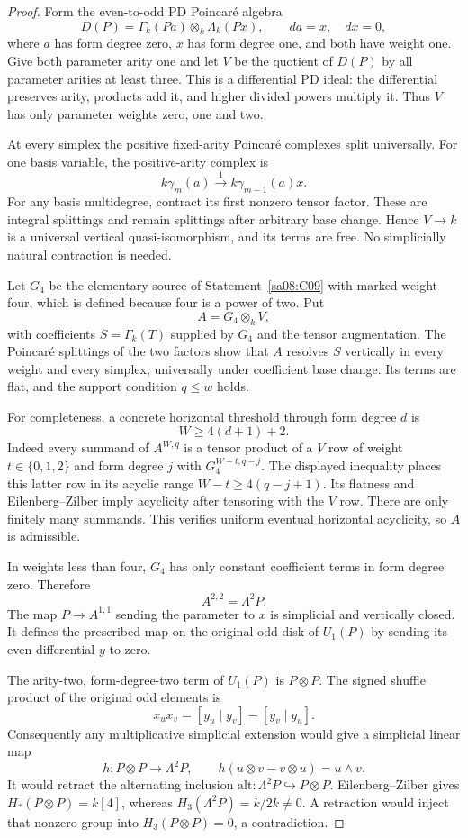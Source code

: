 \begin{proof}
Form the even-to-odd PD Poincar\'e algebra
\[
 D(P)=\Gamma_k(Pa)\otimes_k\Lambda_k(Px),\qquad
 da=x,\quad dx=0,
\]
where $a$ has form degree zero, $x$ has form degree one,
and both have weight one. Give both parameter arity one and let
$V$ be the quotient of $D(P)$ by all parameter arities at least three.
This is a differential PD ideal: the differential preserves arity,
products add it, and higher divided powers multiply it. Thus $V$
has only parameter weights zero, one and two.

At every simplex the positive fixed-arity Poincar\'e complexes split
universally. For one basis variable, the positive-arity complex is
\[
 k\gamma_m(a)\xrightarrow{\ 1\ }
 k\gamma_{m-1}(a)x.
\]
For any basis multidegree, contract its first nonzero tensor factor.
These are integral splittings and remain splittings after arbitrary
base change. Hence $V\to k$ is a universal vertical quasi-isomorphism,
and its terms are free. No simplicially natural contraction is needed.

Let $G_4$ be the elementary source of Statement~\ref{sa08:C09}
with marked weight four, which is defined because four is a power
of two. Put
\[
 A=G_4\otimes_k V,
\]
with coefficients $S=\Gamma_k(T)$ supplied by $G_4$ and the tensor
augmentation. The Poincar\'e splittings of the two factors show that
$A$ resolves $S$ vertically in every weight and every simplex,
universally under coefficient base change. Its terms are flat, and
the support condition $q\leq w$ holds.

For completeness, a concrete horizontal threshold through form degree
$d$ is
\[
 W\geq4(d+1)+2.
\]
Indeed every summand of $A^{W,q}$ is a tensor product of a $V$ row
of weight $t\in\{0,1,2\}$ and form degree $j$ with
$G_4^{W-t,q-j}$. The displayed inequality places this latter row
in its acyclic range $W-t\geq4(q-j+1)$. Its flatness and
Eilenberg--Zilber imply acyclicity after tensoring with the $V$ row.
There are only finitely many summands. This verifies uniform eventual
horizontal acyclicity, so $A$ is admissible.

In weights less than four, $G_4$ has only constant coefficient
terms in form degree zero. Therefore
\[
 A^{2,2}=\Lambda^2P.
\]
The map $P\to A^{1,1}$ sending the parameter to $x$ is simplicial
and vertically closed. It defines the prescribed map on the original
odd disk of $U_1(P)$ by sending its even differential $y$ to zero.

The arity-two, form-degree-two term of $U_1(P)$ is $P\otimes P$.
The signed shuffle product of the original odd elements is
\[
 x_u x_v=[y_u\mid y_v]-[y_v\mid y_u].
\]
Consequently any multiplicative simplicial extension would give a
simplicial linear map
\[
 h:P\otimes P\longrightarrow\Lambda^2P,
 \qquad h(u\otimes v-v\otimes u)=u\wedge v.
\]
It would retract the alternating inclusion
$\mathrm{alt}:\Lambda^2P\hookrightarrow P\otimes P$.
Eilenberg--Zilber gives $H_*(P\otimes P)=k[4]$, whereas
$H_3(\Lambda^2P)=k/2k\neq0$. A retraction would inject that
nonzero group into $H_3(P\otimes P)=0$, a contradiction.


\end{proof}
